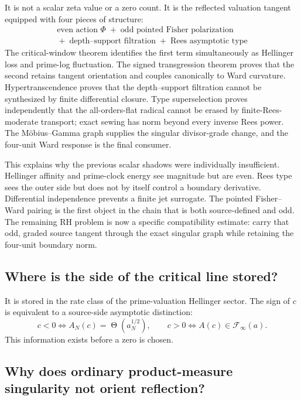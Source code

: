 \documentclass[11pt]{article}
\theoremstyle{definition}
\theoremstyle{remark}
\newcommand{\cF}{\mathcal F}
\newcommand{\Thetaas}{\mathop{\Theta}}
\begin{document}
It is not a scalar zeta value or a zero count.  It is the reflected valuation tangent equipped
with four pieces of structure:
\[
 \boxed{
 \begin{gathered}
 \text{even action }\Phi
 \;+\;
 \text{odd pointed Fisher polarization}\\
 {}+\;
 \text{depth--support filtration}
 \;+\;
 \text{Rees asymptotic type}
 \end{gathered}}
\tag{11.1}\label{eq:universal-source-object}
\]
The critical-window theorem identifies the first term simultaneously as Hellinger loss and
prime-log fluctuation.  The signed transgression theorem proves that the second retains tangent
orientation and couples canonically to Ward curvature.  Hypertranscendence proves that the
depth--support filtration cannot be synthesized by finite differential closure.
Type superselection proves independently that the all-orders-flat radical cannot be erased by
finite-Rees-moderate transport; exact sewing has norm beyond every inverse Rees power.  The
M\"obius--Gamma graph supplies the singular divisor-grade change, and the four-unit Ward response
is the final consumer.

This explains why the previous scalar shadows were individually insufficient.  Hellinger
affinity and prime-clock energy see magnitude but are even.  Rees type sees the outer side but
does not by itself control a boundary derivative.  Differential independence prevents a finite
jet surrogate.  The pointed Fisher--Ward pairing is the first object in the chain that is both
source-defined and odd.  The remaining RH problem is now a specific compatibility estimate:
carry that odd, graded source tangent through the exact singular graph while retaining the
four-unit boundary norm.

\subsection{Where is the side of the critical line stored?}

It is stored in the rate class of the prime-valuation Hellinger sector.  The sign of \(c\) is
equivalent to a source-side asymptotic distinction:
\[
 c<0\iff A_N(c)=\Thetaas(a_N^{1/2}),
 \qquad
 c>0\iff A(c)\in\cF_\infty(a).
\tag{11.2}\label{eq:orientation-answer}
\]
This information exists before a zero is chosen.

\subsection{Why does ordinary product-measure singularity not orient reflection?}
\end{document}
